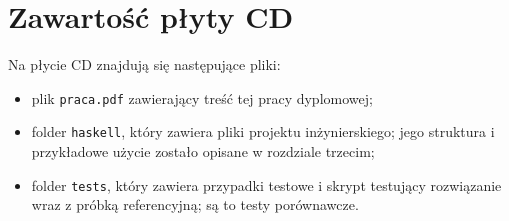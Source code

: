 \documentclass[../praca.tex]{subfiles}
\begin{document}
\appendix
\chapter{Zawartość płyty CD}

Na płycie CD znajdują się następujące pliki:
\begin{itemize}
  \item plik \texttt{praca.pdf} zawierający treść tej pracy dyplomowej;
  \item folder \texttt{haskell}, który zawiera pliki projektu inżynierskiego;
    jego struktura i przykładowe użycie zostało opisane w rozdziale trzecim;
  \item folder \texttt{tests}, który zawiera przypadki testowe i skrypt
    testujący rozwiązanie wraz z próbką referencyjną; są to testy porównawcze.
\end{itemize}
\end{document}

